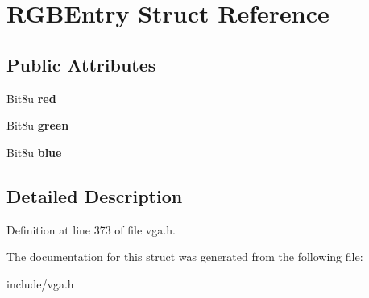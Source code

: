 \hypertarget{structRGBEntry}{\section{R\-G\-B\-Entry Struct Reference}
\label{structRGBEntry}
}
\subsection*{Public Attributes}
\begin{DoxyCompactItemize}
\item 
\hypertarget{structRGBEntry_a51c517e90d0d1bab872e5fdee34a60bc}{Bit8u {\bfseries red}}\label{structRGBEntry_a51c517e90d0d1bab872e5fdee34a60bc}

\item 
\hypertarget{structRGBEntry_adc6713003c2ad77cc873d56e74135362}{Bit8u {\bfseries green}}\label{structRGBEntry_adc6713003c2ad77cc873d56e74135362}

\item 
\hypertarget{structRGBEntry_a96944c8a46f4ae70ec99e8e33d117627}{Bit8u {\bfseries blue}}\label{structRGBEntry_a96944c8a46f4ae70ec99e8e33d117627}

\end{DoxyCompactItemize}


\subsection{Detailed Description}


Definition at line 373 of file vga.\-h.



The documentation for this struct was generated from the following file\-:\begin{DoxyCompactItemize}
\item 
include/vga.\-h\end{DoxyCompactItemize}
